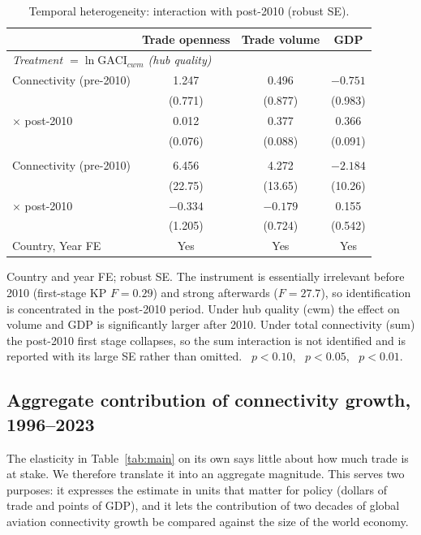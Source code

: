 \begin{table}[ht!]
\centering
\caption{Temporal heterogeneity: interaction with post-2010 (robust SE).}
\label{tab:temporal}
\begin{threeparttable}
\small
\begin{tabular}{lccc}
\toprule
 & Trade openness & Trade volume & GDP \\
\midrule
\multicolumn{4}{l}{\emph{Treatment $=\ln\mathrm{GACI}_{cwm}$ (hub quality)}}\\
Connectivity (pre-2010) & 1.247   & 0.496   & $-0.751$ \\
                        & (0.771) & (0.877) & (0.983) \\
$\times$ post-2010      & 0.012   & 0.377\sym{***} & 0.366\sym{***} \\
                        & (0.076) & (0.088) & (0.091) \\
\addlinespace
\multicolumn{4}{l}{\emph{Treatment $=\ln\mathrm{GACI}_{sum}$ (total connectivity)}}\\
Connectivity (pre-2010) & 6.456   & 4.272   & $-2.184$ \\
                        & (22.75) & (13.65) & (10.26) \\
$\times$ post-2010      & $-0.334$ & $-0.179$ & 0.155 \\
                        & (1.205) & (0.724) & (0.542) \\
\midrule
Country, Year FE        & Yes & Yes & Yes \\
\bottomrule
\end{tabular}
\begin{tablenotes}\footnotesize
\item Country and year FE; robust SE. The instrument is essentially irrelevant
before 2010 (first-stage KP $F=0.29$) and strong afterwards ($F=27.7$), so
identification is concentrated in the post-2010 period. Under hub quality (cwm)
the effect on volume and GDP is significantly larger after 2010. Under total
connectivity (sum) the post-2010 first stage collapses, so the sum interaction is
not identified and is reported with its large SE rather than omitted.
\sym{*}~$p<0.10$, \sym{**}~$p<0.05$, \sym{***}~$p<0.01$.
\end{tablenotes}
\end{threeparttable}
\end{table}

\subsection{Aggregate contribution of connectivity growth, 1996--2023}
\label{sec:aggregate}
The elasticity in Table~\ref{tab:main} on its own says little about how much trade
is at stake. We therefore translate it into an aggregate magnitude. This serves
two purposes: it expresses the estimate in units that matter for policy (dollars
of trade and points of GDP), and it lets the contribution of two decades of global
aviation connectivity growth be compared against the size of the world economy.

